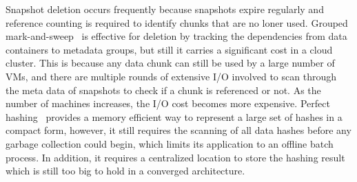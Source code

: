 Snapshot deletion 
occurs frequently because snapshots expire regularly
and reference counting is required to identify chunks that are no loner used.
Grouped mark-and-sweep~\cite{Guo2011} is effective for deletion by tracking
the dependencies from data containers to metadata groups, but still it carries
a significant cost in a cloud cluster. This is because any data chunk can still be
used by a large number of VMs, and there are multiple rounds of extensive I/O involved
to scan through the meta data of snapshots to check if a chunk is referenced or not.
As the number of machines increases, the I/O cost becomes more expensive.
Perfect hashing~\cite{Fabiano2013} provides a memory efficient way to represent a large set of
hashes in a compact form, however, it still requires the scanning of all data hashes before any 
garbage collection could begin, which limits its application to an offline batch process. 
In addition, it requires a centralized location
to store the hashing result which is still too big to hold in a converged architecture.







